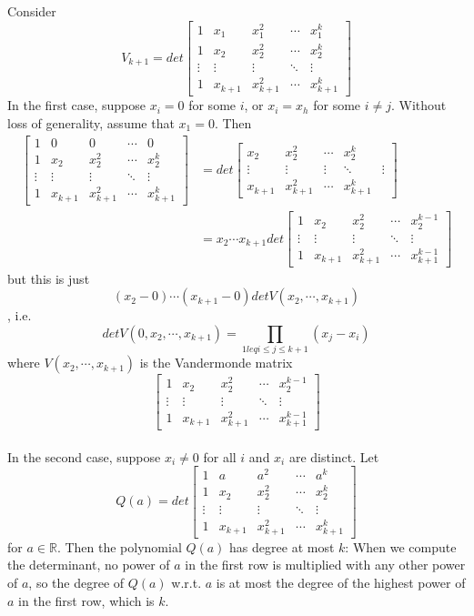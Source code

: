\documentclass[12pt]{article}
\begin{document}
Consider 
$$V_{k+1} = det \begin{bmatrix} 1 & x_1 & x_1^2 & \cdots & x_1^{k} \\ 1 &x_2 & x_2^2 & \cdots & x_2^{k} \\ \vdots & \vdots & \vdots & \ddots & \vdots \\ 1 &x_{k+1} & x_{k+1}^2 & \cdots & x_{k+1}^{k} \end{bmatrix}$$
In the first case, suppose $x_i = 0$ for some $i$, or $x_i = x_h$ for some $i \neq j$. Without loss of generality, assume that $x_1 = 0$. Then 
\begin{align*} 
\begin{bmatrix} 1 & 0 & 0 & \cdots & 0 \\ 1 &x_2 & x_2^2 & \cdots & x_2^{k} \\ \vdots & \vdots & \vdots & \ddots & \vdots \\ 1 &x_{k+1} & x_{k+1}^2 & \cdots & x_{k+1}^{k} \end{bmatrix} &= det \begin{bmatrix} x_2 & x_2^2 & \cdots & x_2^{k} \\ \vdots & \vdots & \vdots & \ddots & \vdots \\ x_{k+1} & x_{k+1}^2 & \cdots & x_{k+1}^{k} \end{bmatrix}\\
&= x_2 \cdots x_{k+1} det \begin{bmatrix} 1 &x_2 & x_2^2 & \cdots & x_2^{k-1} \\ \vdots & \vdots & \vdots & \ddots & \vdots \\ 1 & x_{k+1} & x_{k+1}^2 & \cdots & x_{k+1}^{k-1} \end{bmatrix}
\end{align*}
but this is just
$$(x_2 - 0) \cdots (x_{k+1} - 0) det V(x_2, \cdots, x_{k+1}) $$,
i.e.
$$det V(0, x_2, \cdots, x_{k+1}) = \prod_{1 leq i \leq j \leq k+1}(x_j - x_i)$$
where $V(x_2, \cdots, x_{k+1})$ is the Vandermonde matrix 
$$\begin{bmatrix} 1 &x_2 & x_2^2 & \cdots & x_2^{k-1} \\ \vdots & \vdots & \vdots & \ddots & \vdots \\ 1 & x_{k+1} & x_{k+1}^2 & \cdots & x_{k+1}^{k-1} \end{bmatrix}$$\\

In the second case, suppose $x_i \neq 0$ for all $i$ and $x_i$ are distinct. Let
$$Q(a) = det \begin{bmatrix} 1 & a & a^2 & \cdots & a^{k} \\ 1 &x_2 & x_2^2 & \cdots & x_2^{k} \\ \vdots & \vdots & \vdots & \ddots & \vdots \\ 1 &x_{k+1} & x_{k+1}^2 & \cdots & x_{k+1}^{k} \end{bmatrix}$$
for $a \in \mathbb{R}$. Then the polynomial $Q(a)$ has degree at most $k$: When we compute the determinant, no power of $a$ in the first row is multiplied with any other power of $a$, so the degree of $Q(a)$ w.r.t. $a$ is at most the degree of the highest power of $a$ in the first row, which is $k$.\\
\end{document}
